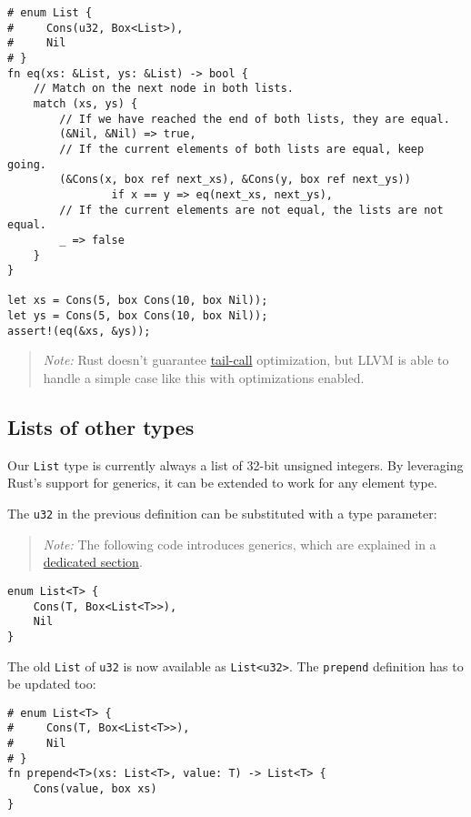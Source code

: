 \documentclass[]{article}
\begin{document}
\begin{verbatim}
# enum List {
#     Cons(u32, Box<List>),
#     Nil
# }
fn eq(xs: &List, ys: &List) -> bool {
    // Match on the next node in both lists.
    match (xs, ys) {
        // If we have reached the end of both lists, they are equal.
        (&Nil, &Nil) => true,
        // If the current elements of both lists are equal, keep going.
        (&Cons(x, box ref next_xs), &Cons(y, box ref next_ys))
                if x == y => eq(next_xs, next_ys),
        // If the current elements are not equal, the lists are not equal.
        _ => false
    }
}

let xs = Cons(5, box Cons(10, box Nil));
let ys = Cons(5, box Cons(10, box Nil));
assert!(eq(&xs, &ys));
\end{verbatim}

\begin{quote}
\emph{Note:} Rust doesn't guarantee
\href{http://en.wikipedia.org/wiki/Tail_call}{tail-call} optimization,
but LLVM is able to handle a simple case like this with optimizations
enabled.
\end{quote}

\subsection{Lists of other types}\label{lists-of-other-types}

Our \texttt{List} type is currently always a list of 32-bit unsigned
integers. By leveraging Rust's support for generics, it can be extended
to work for any element type.

The \texttt{u32} in the previous definition can be substituted with a
type parameter:

\begin{quote}
\emph{Note:} The following code introduces generics, which are explained
in a \hyperref[generics]{dedicated section}.
\end{quote}

\begin{verbatim}
enum List<T> {
    Cons(T, Box<List<T>>),
    Nil
}
\end{verbatim}

The old \texttt{List} of \texttt{u32} is now available as
\texttt{List\textless{}u32\textgreater{}}. The \texttt{prepend}
definition has to be updated too:

\begin{verbatim}
# enum List<T> {
#     Cons(T, Box<List<T>>),
#     Nil
# }
fn prepend<T>(xs: List<T>, value: T) -> List<T> {
    Cons(value, box xs)
}
\end{verbatim}
\end{document}
